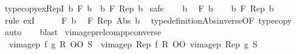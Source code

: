 \begin{isabellebody}
\isanewline
{}\isamarkupfalse%
\ type{\isacharunderscore}{\kern0pt}copy{\isacharunderscore}{\kern0pt}ex{\isacharunderscore}{\kern0pt}RepI{\isacharcolon}{\kern0pt}\ {\isachardoublequoteopen}{\isacharparenleft}{\kern0pt}{\isasymexists}b{\isachardot}{\kern0pt}\ F\ b{\isacharparenright}{\kern0pt}\ {\isacharequal}{\kern0pt}\ {\isacharparenleft}{\kern0pt}{\isasymexists}b{\isachardot}{\kern0pt}\ F\ {\isacharparenleft}{\kern0pt}Rep\ b{\isacharparenright}{\kern0pt}{\isacharparenright}{\kern0pt}{\isachardoublequoteclose}\isanewline
%
\isadelimproof
%
\endisadelimproof
%
\isatagproof
{}\isamarkupfalse%
\ safe\isanewline
\ \ \isamarkupfalse%
\ b\ \isamarkupfalse%
\ {\isachardoublequoteopen}F\ b{\isachardoublequoteclose}\isanewline
\ \ \isamarkupfalse%
\ {\isachardoublequoteopen}{\isasymexists}b{\isacharprime}{\kern0pt}{\isachardot}{\kern0pt}\ F\ {\isacharparenleft}{\kern0pt}Rep\ b{\isacharprime}{\kern0pt}{\isacharparenright}{\kern0pt}{\isachardoublequoteclose}\isanewline
\ \ \isamarkupfalse%
\ {\isacharparenleft}{\kern0pt}rule\ exI{\isacharparenright}{\kern0pt}\isanewline
\ \ \ \ \isamarkupfalse%
\ {\isacartoucheopen}F\ b{\isacartoucheclose}\ \isamarkupfalse%
\ {\isachardoublequoteopen}F\ {\isacharparenleft}{\kern0pt}Rep\ {\isacharparenleft}{\kern0pt}Abs\ b{\isacharparenright}{\kern0pt}{\isacharparenright}{\kern0pt}{\isachardoublequoteclose}\ \isamarkupfalse%
\ type{\isacharunderscore}{\kern0pt}definition{\isachardot}{\kern0pt}Abs{\isacharunderscore}{\kern0pt}inverse{\isacharbrackleft}{\kern0pt}OF\ type{\isacharunderscore}{\kern0pt}copy{\isacharbrackright}{\kern0pt}\ \isamarkupfalse%
\ auto\isanewline
\ \ \isamarkupfalse%
\isanewline
{}\isamarkupfalse%
\ blast%
\endisatagproof
{\isafoldproof}%
%
\isadelimproof
\isanewline
%
\endisadelimproof
\isanewline
{}\isamarkupfalse%
\ vimage{}p{\isacharunderscore}{\kern0pt}relcompp{\isacharunderscore}{\kern0pt}converse{\isacharcolon}{\kern0pt}\isanewline
\ \ {\isachardoublequoteopen}vimage{}p\ f\ g\ {\isacharparenleft}{\kern0pt}R{\isasyminverse}{\isasyminverse}\ OO\ S{\isacharparenright}{\kern0pt}\ {\isacharequal}{\kern0pt}\ {\isacharparenleft}{\kern0pt}vimage{}p\ Rep\ f\ R{\isacharparenright}{\kern0pt}{\isasyminverse}{\isasyminverse}\ OO\ vimage{}p\ Rep\ g\ S{\isachardoublequoteclose}\isanewline
%
\isadelimproof
\ \ %
\endisadelimproof
%
\isatagproof
{}\isamarkupfalse%

\end{isabellebody}
